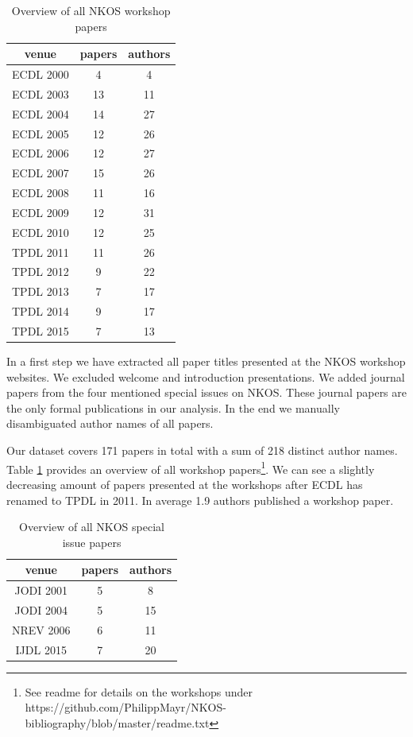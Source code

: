 \documentclass[runningheads,a4paper]{llncs}
\begin{document}
\begin{table}
	\centering
	\caption{Overview of all NKOS workshop papers}
	\begin{tabular}	{|c|c|c|}		
		\hline 
		venue& papers  & authors  \\ 
		\hline 
		ECDL 2000& 4 & 4 \\ 
		\hline 
		ECDL 2003& 13 & 11 \\ 
		\hline 
		ECDL 2004& 14 & 27 \\ 
		\hline 
		ECDL 2005& 12 & 26 \\ 
		\hline 
		ECDL 2006& 12 & 27 \\ 
		\hline 
		ECDL 2007& 15 & 26 \\ 
		\hline 
		ECDL 2008& 11 & 16 \\ 
		\hline 
		ECDL 2009& 12 & 31 \\ 
		\hline 
		ECDL 2010& 12 & 25 \\ 
		\hline 
		TPDL 2011& 11 & 26 \\ 
		\hline 
		TPDL 2012& 9 & 22 \\ 
		\hline 
		TPDL 2013& 7 & 17 \\ 
		\hline 
		TPDL 2014& 9 & 17 \\ 
		\hline 
		TPDL 2015& 7 & 13 \\ 
		\hline 
	\end{tabular} 
	\label{tab:workshops}
\end{table}

In a first step we have extracted all paper titles presented at the NKOS workshop websites. We excluded welcome and introduction presentations. We added journal papers from the four mentioned special issues on NKOS. These journal papers are the only formal publications in our analysis. In the end we manually disambiguated author names of all papers.

Our dataset covers 171 papers in total with a sum of 218 distinct author names. Table \ref{tab:workshops} provides an overview of all workshop papers\footnote{See readme for details on the workshops under https://github.com/PhilippMayr/NKOS-bibliography/blob/master/readme.txt}. We can see a slightly decreasing amount of papers presented at the workshops after ECDL has renamed to TPDL in 2011. In average 1.9 authors published a workshop paper.

\begin{table}
	\centering
	\caption{Overview of all NKOS special issue papers}
\begin{tabular}{|c|c|c|}  
	\hline 
	venue& papers  & authors  \\ 
	\hline 
	JODI 2001 \cite{Hill2001} & 5 & 8 \\ 
	\hline 
	JODI 2004 \cite{Tudhope2004} & 5 & 15 \\ 
	\hline 
	NREV 2006 \cite{Tudhope2006} & 6 & 11 \\ 
	\hline 
	IJDL 2015 \cite{Mayr2016} & 7 &  20\\ 
	\hline 
\end{tabular} 
\label{tab:SI}
\end{table} 
\end{document}
